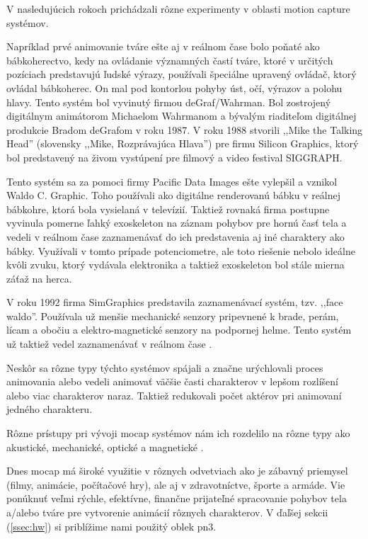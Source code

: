 V nasledujúcich rokoch prichádzali rôzne experimenty v oblasti motion capture systémov. 

Napríklad prvé animovanie tváre ešte aj v reálnom čase bolo poňaté ako bábkoherectvo, kedy na ovládanie významných častí tváre, ktoré v určitých pozíciach predstavujú ľudské výrazy, používali špeciálne upravený ovládač, ktorý ovládal bábkoherec. On mal pod kontorlou pohyby úst, očí, výrazov a polohu hlavy. Tento systém bol vyvinutý firmou deGraf/Wahrman. Bol zostrojený digitálnym animátorom Michaelom Wahrmanom a bývalým riaditeľom digitálnej produkcie Bradom deGrafom v roku 1987. V roku 1988 stvorili ,,Mike the Talking Head'' (slovensky ,,Mike, Rozprávajúca Hlava'') pre firmu Silicon Graphics, ktorý bol predstavený na živom vystúpení pre filmový a video festival SIGGRAPH.

Tento systém sa za pomoci firmy Pacific Data Images ešte vylepšil a vznikol Waldo C. Graphic. Toho používali ako digitálne renderovanú bábku v reálnej bábkohre, ktorá bola vysielaná v televízií. Taktiež rovnaká firma postupne vyvinula pomerne ľahký exoskeleton na záznam pohybov pre hornú časť tela a vedeli v reálnom čase zaznamenávať do ich predstavenia aj iné charaktery ako bábky. Využívali v tomto prípade potenciometre, ale toto riešenie nebolo ideálne kvôli zvuku, ktorý vydávala elektronika a taktiež exoskeleton bol stále mierna záťaž na herca.

V roku 1992 firma SimGraphics predstavila zaznamenávací systém, tzv. ,,face waldo''. Používala už menšie mechanické senzory pripevnené k brade, perám, lícam a obočiu a elektro-magnetické senzory na podpornej helme. Tento systém už taktiež vedel zaznamenávať v reálnom čase \cite{mocapHistory}.

Neskôr sa rôzne typy týchto systémov spájali a značne urýchlovali proces animovania alebo vedeli animovať väčšie časti charakterov v lepšom rozlíšení alebo viac charakterov naraz. Taktiež redukovali počet aktérov pri animovaní jedného charakteru.

Rôzne prístupy pri vývoji mocap systémov nám ich rozdelilo na rôzne typy ako akustické, mechanické, optické a magnetické \cite{mocapFundamentals}.

Dnes mocap má široké využitie v rôznych odvetviach ako je zábavný priemysel (filmy, animácie, počítačové hry), ale aj v zdravotníctve, športe a armáde. Vie ponúknuť veľmi rýchle, efektívne, finančne prijateľné spracovanie pohybov tela a/alebo tváre pre vytvorenie animácií rôznych charakterov. V ďaľšej sekcii (\ref{ssec:hw}) si priblížime nami použitý oblek \acrfull{pn3}.

